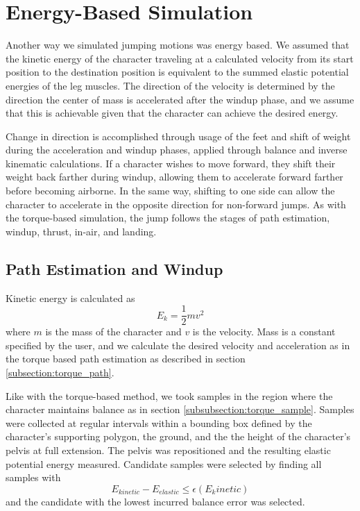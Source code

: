 \section{Energy-Based Simulation}
\label{section:energy}
Another way we simulated jumping motions was energy based.  We assumed that the kinetic energy of the character traveling at a calculated velocity from its start position to the destination position is equivalent to the summed elastic potential energies of the leg muscles.  The direction of the velocity is determined by the direction the center of mass is accelerated after the windup phase, and we assume that this is achievable given that the character can achieve the desired energy.  

Change in direction is accomplished through usage of the feet and shift of weight during the acceleration and windup phases, applied through balance and inverse kinematic calculations.  If a character wishes to move forward, they shift their weight back farther during windup, allowing them to accelerate forward farther before becoming airborne.  In the same way, shifting to one side can allow the character to accelerate in the opposite direction for non-forward jumps.  As with the torque-based simulation, the jump follows the stages of path estimation, windup, thrust, in-air, and landing.

\subsection{Path Estimation and Windup}
\label{subsection:energy_path}
Kinetic energy is calculated as \[ E_k = \frac{1}{2} m v^2 \] where $m$ is the mass of the character and $v$ is the velocity.  Mass is a constant specified by the user, and we calculate the desired velocity and acceleration as in the torque based path estimation as described in section \ref{subsection:torque_path}.

Like with the torque-based method, we took samples in the region where the character maintains balance as in section \ref{subsubsection:torque_sample}.  Samples were collected at regular intervals within a bounding box defined by the character's supporting polygon, the ground, and the the height of the character's pelvis at full extension.  The pelvis was repositioned and the resulting elastic potential energy measured.  Candidate samples were selected by finding all samples with \[ E_{kinetic} - E_{elastic} \le \epsilon(E_kinetic)\] and the candidate with the lowest incurred balance error was selected.

